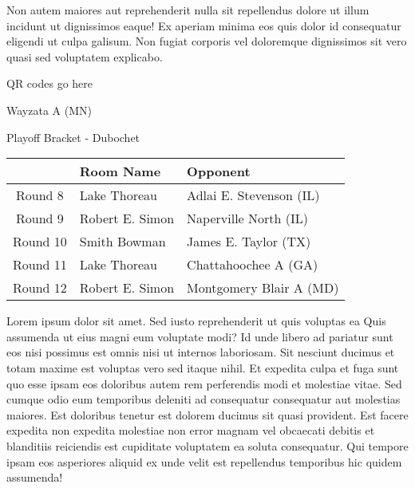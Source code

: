 \documentclass{article}%
\begin{document}
\newline%
Non autem maiores aut reprehenderit nulla sit repellendus dolore ut illum incidunt ut dignissimos eaque! Ex aperiam minima eos quis dolor id consequatur eligendi ut culpa galisum. Non fugiat corporis vel doloremque dignissimos sit vero quasi sed voluptatem explicabo.\newline%
\newline%
%
\vspace*{30pt}%
\begin{center}%
\begin{Huge}%
QR codes go here%
\end{Huge}%
\end{center}%
\newpage%
\begin{center}%
\begin{Huge}%
Wayzata A (MN)%
\end{Huge}%
\vspace*{8pt}%
\linebreak%
\begin{Large}%
Playoff Bracket {-} Dubochet%
\end{Large}%
\end{center}%
\begin{tabularx}{\textwidth}{|c|Y|Y|}%
\hline%
&Room Name&Opponent\\%
\hline%
Round 8&Lake Thoreau&Adlai E. Stevenson (IL)\\%
Round 9&Robert E. Simon&Naperville North (IL)\\%
Round 10&Smith Bowman&James E. Taylor (TX)\\%
Round 11&Lake Thoreau&Chattahoochee A (GA)\\%
Round 12&Robert E. Simon&Montgomery Blair A (MD)\\%
\hline%
\end{tabularx}%
\vspace*{8pt}%
\linebreak%
\newline%
\newline%
Lorem ipsum dolor sit amet. Sed iusto reprehenderit ut quis voluptas ea Quis assumenda ut eius magni eum voluptate modi? Id unde libero ad pariatur sunt eos nisi possimus est omnis nisi ut internos laboriosam. Sit nesciunt ducimus et totam maxime est voluptas vero sed itaque nihil. Et expedita culpa et fuga sunt quo esse ipsam eos doloribus autem rem perferendis modi et molestiae vitae.\newline%
\newline%
Sed cumque odio eum temporibus deleniti ad consequatur consequatur aut molestias maiores. Est doloribus tenetur est dolorem ducimus sit quasi provident. Est facere expedita non expedita molestiae non error magnam vel obcaecati debitis et blanditiis reiciendis est cupiditate voluptatem ea soluta consequatur. Qui tempore ipsam eos asperiores aliquid ex unde velit est repellendus temporibus hic quidem assumenda!\newline%
\end{document}
